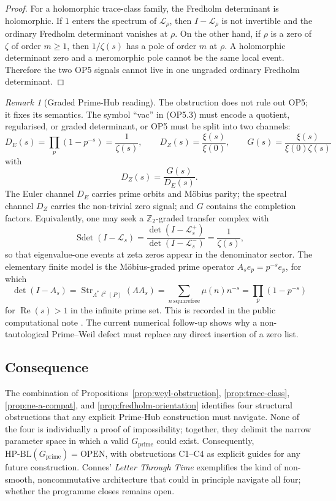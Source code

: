 \documentclass[11pt]{article}
\theoremstyle{definition}
\theoremstyle{remark}
\newtheorem{remark}[theorem]{Remark}
\newcommand{\HBL}{\mathrm{HP\text{-}BL}}
\renewcommand{\Re}{\operatorname{Re}}
\begin{document}
\begin{proof}
For a holomorphic trace-class family, the Fredholm determinant is
holomorphic. If $1$ enters the spectrum of $\mathcal{L}_\rho$, then
$I-\mathcal{L}_\rho$ is not invertible and the ordinary Fredholm
determinant vanishes at $\rho$. On the other hand, if $\rho$ is a zero
of $\zeta$ of order $m\geq 1$, then $1/\zeta(s)$ has a pole of order
$m$ at $\rho$. A holomorphic determinant zero and a meromorphic pole
cannot be the same local event. Therefore the two OP5 signals cannot
live in one ungraded ordinary Fredholm determinant.
\end{proof}

\begin{remark}[Graded Prime-Hub reading]\label{rem:graded-primehub}
The obstruction does not rule out OP5; it fixes its semantics. The
symbol ``vac'' in (OP5.3) must encode a quotient, regularised, or
graded determinant, or OP5 must be split into two channels:
\[
  D_E(s)=\prod_p(1-p^{-s})=\frac{1}{\zeta(s)},\qquad
  D_Z(s)=\frac{\xi(s)}{\xi(0)},\qquad
  G(s)=\frac{\xi(s)}{\xi(0)\zeta(s)}
\]
with
\[
  D_Z(s)=\frac{G(s)}{D_E(s)}.
\]
The Euler channel $D_E$ carries prime orbits and M\"obius parity; the
spectral channel $D_Z$ carries the non-trivial zero signal; and
$G$ contains the completion factors. Equivalently, one may seek a
$\mathbb{Z}_2$-graded transfer complex with
\[
  \operatorname{Sdet}(I-\mathcal{L}_s)
  =\frac{\det(I-\mathcal{L}_s^+)}
          {\det(I-\mathcal{L}_s^-)}
  =\frac{1}{\zeta(s)},
\]
so that eigenvalue-one events at zeta zeros appear in the denominator
sector. The elementary finite model is the M\"obius-graded prime
operator $A_s e_p=p^{-s}e_p$, for which
\[
  \det(I-A_s)=\operatorname{Str}_{\Lambda^\ast\ell^2(P)}(\Lambda A_s)
  =\sum_{n\ \mathrm{squarefree}}\mu(n)n^{-s}
  =\prod_p(1-p^{-s})
\]
for $\Re(s)>1$ in the infinite prime set. This is recorded in the
public computational note \cite{MobiusGradedPrimeHub}. The current numerical
follow-up \cite{PrimeWeilBridgeDefect} shows why a non-tautological
Prime--Weil defect must replace any direct insertion of a zero list.
\end{remark}

\subsection{Consequence}

The combination of Propositions~\ref{prop:weyl-obstruction},
\ref{prop:trace-class}, \ref{prop:ne-a-compat}, and
\ref{prop:fredholm-orientation} identifies four
structural obstructions that any explicit Prime-Hub construction
must navigate. None of the four is individually a proof of
impossibility; together, they delimit the narrow parameter space in
which a valid $G_\mathrm{prime}$ could exist. Consequently,
$\HBL(G_\mathrm{prime}) = \mathrm{OPEN}$, with obstructions C1--C4
as explicit guides for any future construction. Connes'
\emph{Letter Through Time} \cite{Connes2026} exemplifies the kind of
non-smooth, noncommutative architecture that could in principle
navigate all four; whether the programme closes remains open.
\end{document}
